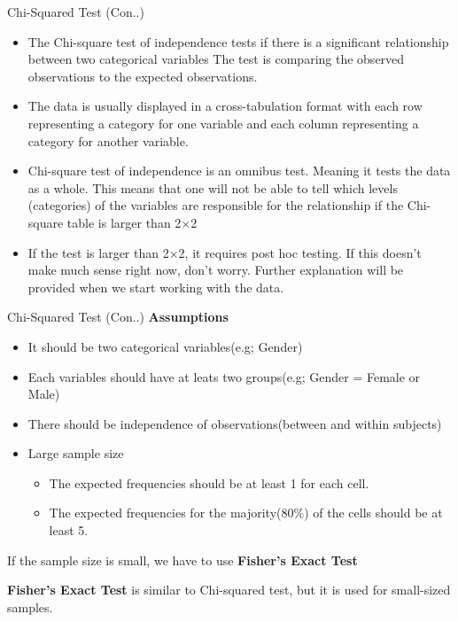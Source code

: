 \begin{frame}[t]{Chi-Squared Test (Con..)}

	\begin{itemize}
		\item The Chi-square test of independence tests if there is a significant relationship between two categorical variables
		The test is comparing the observed observations to the expected observations.
		\item The data is usually displayed in a cross-tabulation format with each row representing a category for one variable and each column representing a category for another variable.
		\item Chi-square test of independence is an omnibus test. Meaning it tests the data as a whole. This means that one will not be able to tell which levels (categories) of the variables are responsible for the relationship if the Chi-square table is larger than 2×2
		\item If the test is larger than 2×2, it requires post hoc testing. If this doesn’t make much sense right now, don’t worry. Further explanation will be provided when we start working with the data.
	\end{itemize}
\end{frame}
\begin{frame}[t]{Chi-Squared Test (Con..)}
	\textbf{Assumptions} \\
		\begin{itemize}
		\item It should be two categorical  variables(e.g; Gender)
		\item Each variables should have at leats two groups(e.g; Gender = Female or Male)
		\item There should be independence of observations(between and within subjects)
		\item Large sample size
		\begin{itemize}
			\item The expected frequencies should be at least 1 for each cell.
			\item The expected frequencies for the majority(80\%) of the cells should be at least 5.
		\end{itemize}
	\end{itemize}
		If the sample size is small, we have to use \textbf{Fisher's Exact Test}
		
		\textbf{Fisher's Exact Test} is similar to Chi-squared test, but it is used for small-sized samples.
\end{frame}



